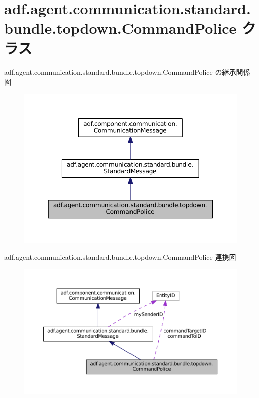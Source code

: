 \hypertarget{classadf_1_1agent_1_1communication_1_1standard_1_1bundle_1_1topdown_1_1CommandPolice}{}\section{adf.\+agent.\+communication.\+standard.\+bundle.\+topdown.\+Command\+Police クラス}
\label{classadf_1_1agent_1_1communication_1_1standard_1_1bundle_1_1topdown_1_1CommandPolice}


adf.\+agent.\+communication.\+standard.\+bundle.\+topdown.\+Command\+Police の継承関係図
\nopagebreak
\begin{figure}[H]
\begin{center}
\leavevmode
\includegraphics[width=350pt]{classadf_1_1agent_1_1communication_1_1standard_1_1bundle_1_1topdown_1_1CommandPolice__inherit__graph}
\end{center}
\end{figure}


adf.\+agent.\+communication.\+standard.\+bundle.\+topdown.\+Command\+Police 連携図
\nopagebreak
\begin{figure}[H]
\begin{center}
\leavevmode
\includegraphics[width=350pt]{classadf_1_1agent_1_1communication_1_1standard_1_1bundle_1_1topdown_1_1CommandPolice__coll__graph}
\end{center}
\end{figure}

